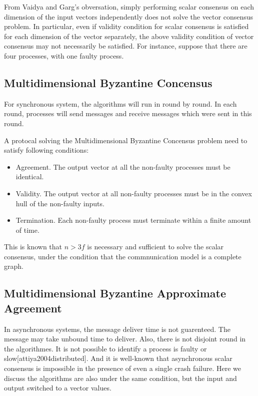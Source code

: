 From Vaidya and Garg's obversation, simply performing scalar consensus on
each dimension of the input vectors independently does not solve the vector consensus problem.
In particular, even if validity condition for scalar consensus is satisfied for each dimension of the
vector separately, the above validity condition of vector consensus may not necessarily be satisfied.
For instance, suppose that there are four processes, with one faulty process\cite{vaidya2013byzantine}.

\subsection{Multidimensional Byzantine Concensus}

For synchronous system, the algorithms will run in round by round. In each round, processes
will send messages and receive messages which were sent in this round.

A protocal solving the Multidimensional Byzantine Concensus problem need to satisfy following
conditions\cite{mendes2015multidimensional}:

\begin{itemize}
    \item Agreement. The output vector at all the non-faulty processes must be identical.

    \item Validity. The output vector at all non-faulty processes must be in the convex hull of
the non-faulty inputs.

    \item Termination. Each non-faulty process must terminate within a finite amount of time.

\end{itemize}

This is known that $n > 3f$ is necessary and sufficient to solve the scalar consensus, under the condition
that the commnunication model is a complete graph. 


\subsection{Multidimensional Byzantine Approximate Agreement}
In asynchronous systems, the message deliver time is not guarenteed. The message may take unbound time
to deliver. Also, there is not disjoint round in the algorithmes. It is not possible to identify a
process is faulty or slow[attiya2004distributed]. And it is well-known that asynchronous scalar consensus
is impossible in the presence of even a single crash failure\cite{fischer1985impossibility}. Here we
discuss the algorithms are also under the same condition, but the input and output switched to a
vector values.


